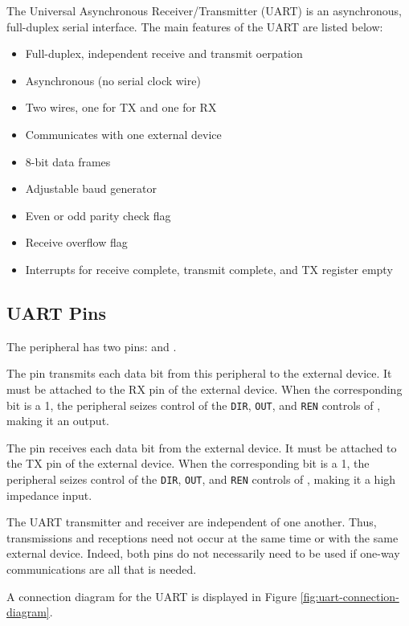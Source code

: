 The Universal Asynchronous Receiver/Transmitter (UART) is an asynchronous, full-duplex serial interface. The main features of the UART are listed below:

\begin{itemize}
	\item Full-duplex, independent receive and transmit oerpation
	\item Asynchronous (no serial clock wire)
	\item Two wires, one for TX and one for RX
	\item Communicates with one external device
	\item 8-bit data frames
	\item Adjustable baud generator
	\item Even or odd parity check flag
	\item Receive overflow flag
	\item Interrupts for receive complete, transmit complete, and TX register empty
\end{itemize}



\subsection{UART Pins}

The  peripheral has two pins:  and .

The  pin transmits each data bit from this  peripheral to the external device. It must be attached to the RX pin of the external device. When the corresponding  bit is a 1, the  peripheral seizes control of the \texttt{DIR}, \texttt{OUT}, and \texttt{REN} controls of , making it an output.

The  pin receives each data bit from the external device. It must be attached to the TX pin of the external device. When the corresponding  bit is a 1, the  peripheral seizes control of the \texttt{DIR}, \texttt{OUT}, and \texttt{REN} controls of , making it a high impedance input.

The UART transmitter and receiver are independent of one another. Thus, transmissions and receptions need not occur at the same time or with the same external device. Indeed, both pins do not necessarily need to be used if one-way communications are all that is needed.

A connection diagram for the UART is displayed in Figure \ref{fig:uart-connection-diagram}.

